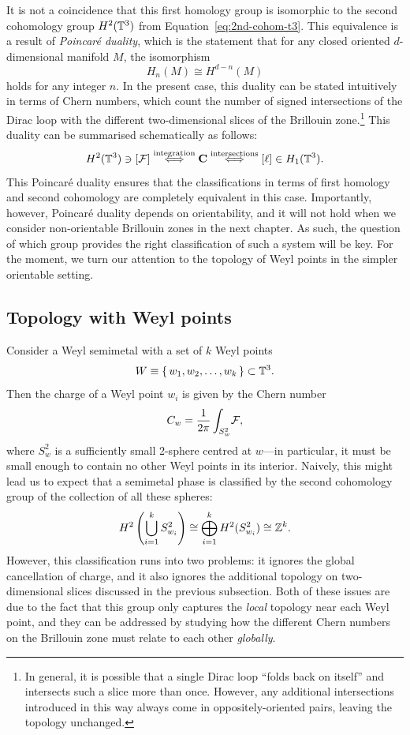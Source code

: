 It is not a coincidence that this first homology group is isomorphic to the second cohomology group $H^2(\mathbb{T}^3)$ from Equation~\eqref{eq:2nd-cohom-t3}. This equivalence is a result of \emph{Poincar\'e duality}, which is the statement that for any closed oriented $d$-dimensional manifold $M$, the isomorphism
\[
	H_n(M) \cong H^{d-n}(M)
\]
holds for any integer $n$. In the present case, this duality can be stated intuitively in terms of Chern numbers, which count the number of signed intersections of the Dirac loop with the different two-dimensional slices of the Brillouin zone.\footnote{
	In general, it is possible that a single Dirac loop ``folds back on itself'' and intersects such a slice more than once. However, any additional intersections introduced in this way always come in oppositely-oriented pairs, leaving the topology unchanged.}
This duality can be summarised schematically as follows:
\begin{equation}\label{eq:duality-scheme}
	H^2(\mathbb{T}^3) \ni [\mathcal{F}] \overset{\rm integration}{\iff}
	\vb{C} \overset{\rm intersections}{\iff} [\ell] \in H_1(\mathbb{T}^3).
\end{equation}
This Poincar\'e duality ensures that the classifications in terms of first homology and second cohomology are completely equivalent in this case. Importantly, however, Poincar\'e duality depends on orientability, and it will not hold when we consider non-orientable Brillouin zones in the next chapter. As such, the question of which group provides the right classification of such a system will be key. For the moment, we turn our attention to the topology of Weyl points in the simpler orientable setting.


\subsection{Topology with Weyl points}\label{sec:Weyl-point-topology}

Consider a Weyl semimetal with a set of $k$ Weyl points
\[
	W \equiv \set{w_1,w_2,\ldots,w_k}\subset \mathbb{T}^3.
\]
Then the charge of a Weyl point $w_i$ is given by the Chern number
\begin{equation*}
	C_w = \frac{1}{2\pi}\int_{S_w^2}\!\mathcal{F},
\end{equation*}
where $S_w^2$ is a sufficiently small 2-sphere centred at $w$---in particular, it must be small enough to contain no other Weyl points in its interior. Naively, this might lead us to expect that a semimetal phase is classified by the second cohomology group of the collection of all these spheres:
\begin{equation}\label{eq:2nd-cohom-spheres}
	H^2\left(\bigcup_{i=1}^k S_{w_i}^2\right)\cong \bigoplus_{i=1}^k H^2(S_{w_i}^2) \cong \mathbb{Z}^k.
\end{equation}
However, this classification runs into two problems: it ignores the global cancellation of charge, and it also ignores the additional topology on two-dimensional slices discussed in the previous subsection. Both of these issues are due to the fact that this group only captures the \emph{local} topology near each Weyl point, and they can be addressed by studying how the different Chern numbers on the Brillouin zone must relate to each other \emph{globally}.

